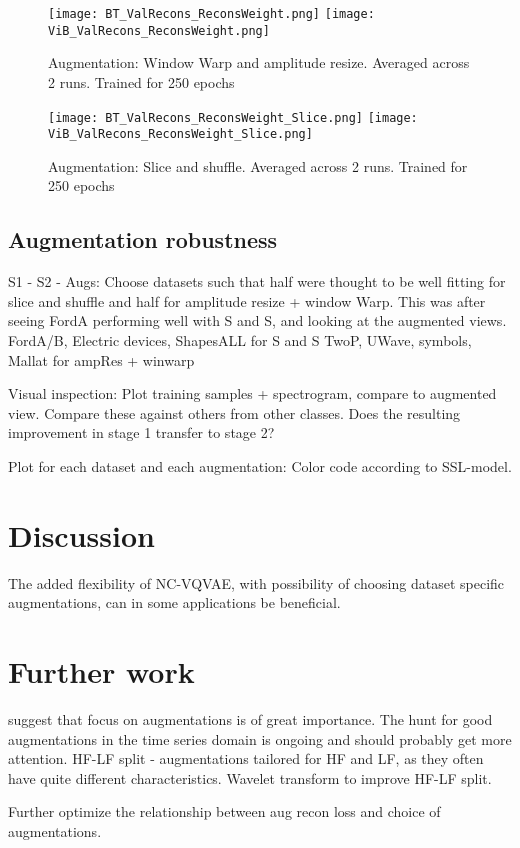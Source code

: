 \documentclass[../../thesis.tex]{subfiles}
\begin{document}
\begin{figure}[h]
    \texttt{[image: BT\_ValRecons\_ReconsWeight.png]}
    \texttt{[image: ViB\_ValRecons\_ReconsWeight.png]}
    \caption{Augmentation: Window Warp and amplitude resize. Averaged across 2 runs. Trained for 250 epochs}  
\end{figure}
\begin{figure}[h]
    \texttt{[image: BT\_ValRecons\_ReconsWeight\_Slice.png]}
    \texttt{[image: ViB\_ValRecons\_ReconsWeight\_Slice.png]}
    \caption{Augmentation: Slice and shuffle. Averaged across 2 runs. Trained for 250 epochs}  
\end{figure}
\subsection{Augmentation robustness}
\label{section:Augmentation robustness}
S1 - S2 - Augs: Choose datasets such that half were thought to be well fitting for slice and shuffle and half for amplitude resize + window Warp. This was after seeing FordA performing well with S and S, and looking at the augmented views.\newline
FordA/B, Electric devices, ShapesALL for S and S\newline
TwoP, UWave, symbols, Mallat for ampRes + winwarp\newline

Visual inspection: Plot training samples + spectrogram, compare to augmented view. Compare these against others from other classes. \newline
Does the resulting improvement in stage 1 transfer to stage 2? 

Plot for each dataset and each augmentation: 
Color code according to SSL-model.
\section{Discussion}
The added flexibility of NC-VQVAE, with possibility of choosing dataset specific augmentations, can in some applications be beneficial.\newline


\section{Further work}
\cite{morningstar2024augmentations} suggest that focus on augmentations is of great importance. The hunt for good augmentations in the time series domain is ongoing and should probably get more attention.\newline
HF-LF split - augmentations tailored for HF and LF, as they often have quite different characteristics.\newline
Wavelet transform to improve HF-LF split.\newline

Further optimize the relationship between aug recon loss and choice of augmentations.\newline
\end{document}
